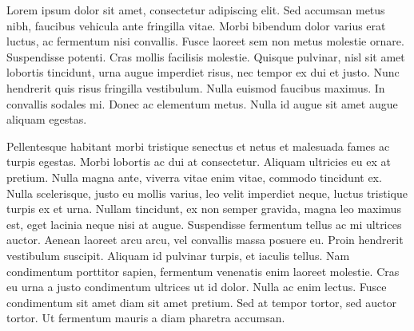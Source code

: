Lorem ipsum dolor sit amet, consectetur adipiscing elit. Sed accumsan metus
nibh, faucibus vehicula ante fringilla vitae. Morbi bibendum dolor varius erat
luctus, ac fermentum nisi convallis. Fusce laoreet sem non metus molestie
ornare. Suspendisse potenti. Cras mollis facilisis molestie. Quisque pulvinar,
nisl sit amet lobortis tincidunt, urna augue imperdiet risus, nec tempor ex dui
et justo. Nunc hendrerit quis risus fringilla vestibulum. Nulla euismod
faucibus maximus. In convallis sodales mi. Donec ac elementum metus. Nulla id
augue sit amet augue aliquam egestas.

Pellentesque habitant morbi tristique senectus et netus et malesuada fames ac
turpis egestas. Morbi lobortis ac dui at consectetur. Aliquam ultricies eu ex
at pretium. Nulla magna ante, viverra vitae enim vitae, commodo tincidunt ex.
Nulla scelerisque, justo eu mollis varius, leo velit imperdiet neque, luctus
tristique turpis ex et urna. Nullam tincidunt, ex non semper gravida, magna leo
maximus est, eget lacinia neque nisi at augue. Suspendisse fermentum tellus ac
mi ultrices auctor. Aenean laoreet arcu arcu, vel convallis massa posuere eu.
Proin hendrerit vestibulum suscipit. Aliquam id pulvinar turpis, et iaculis
tellus. Nam condimentum porttitor sapien, fermentum venenatis enim laoreet
molestie. Cras eu urna a justo condimentum ultrices ut id dolor. Nulla ac enim
lectus. Fusce condimentum sit amet diam sit amet pretium. Sed at tempor tortor,
sed auctor tortor. Ut fermentum mauris a diam pharetra accumsan.

